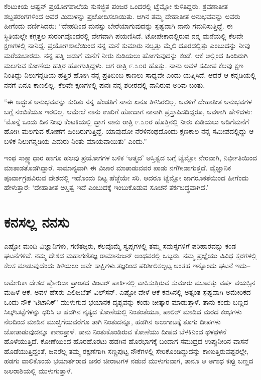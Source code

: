 ಕೆಂಟುಕಿಯ ಆಷ್ಟನ್ ಪ್ರಯೋಗಶಾಲೆಯ ಸುಸಜ್ಜಿತ ಪಂಜರ ಒಂದರಲ್ಲಿ ಟ್ವೆಮ್ಲೋ ಕುಳಿತಿದ್ದರು. ಶ್ರವಣಾತೀತ ಶಬ್ದತರಂಗಗಳಿಂದ ಅವರ ಮಿದುಳನ್ನು ಪ್ರಚೋದಿಸಲಾಯಿತು. ಆಗಿನ ತಮ್ಮ ದೇಹಾತೀತ ಅನುಭವವನ್ನು ಅವರು ಹೀಗೆಂದು ವರ್ಣಿಸಿದರು: “ದೇಹದಿಂದ ಮನಸ್ಸು ಬೇರೆ\-ಯಾಗು\-ವುದನ್ನು ಸ್ಪಷ್ಟವಾಗಿ ನಾನು ಗಮನಿಸುತ್ತಿದ್ದೆ. ಈ ಸ್ಥಿತಿಯಲ್ಲೇ ಕಗ್ಗತ್ತಲ ಸುರಂಗವೊಂದರಲ್ಲಿ ವೇಗವಾಗಿ ಪಯಣಿಸಿದೆ. ಟೋಪೇಕಾದಲ್ಲಿರುವ ನನ್ನ ಮನೆಯಲ್ಲಿ ಕೆಲವೇ ಕ್ಷಣಗಳಲ್ಲಿ ನಾನಿದ್ದೆ. ಪ್ರಯೋಗಶಾಲೆಯಿಂದ ನನ್ನ ಮನೆ ಸುಮಾರು ನಲ್ವತ್ತು ಮೈಲಿ ದೂರದಲ್ಲಿತ್ತು ಎಂಬುದನ್ನು ನೀವು ಮರೆಯಬಾರದು. ನನ್ನ ಪತ್ನಿ ಅಡುಗೆ ಮನೆಗೆ ನೀರು ಕುಡಿಯಲು ಹೋಗುವುದನ್ನು ಕಂಡೆ. ಆಕೆ ಅಲ್ಲಿಂದ ಹಿಂದಿರುಗಿ ಮಲಗುವ ಕೋಣೆಯ ಹತ್ತಿರ ಹೋಗುತ್ತಿದ್ದಳು. ಆಗ ರಾತ್ರಿ ೯.೩೦ರ ಹೊತ್ತು. ನಾನು ಅವಳ ಸಮೀಪ ಕೆಲವು ಕ್ಷಣ ನಿಂತಿದ್ದು ನಿಲುಗನ್ನಡಿಯ ಹತ್ತಿರ ಹೋಗಿ ನನ್ನ ಪ್ರತಿಬಿಂಬ ಕಾಣಲು ಸಾಧ್ಯವೇ ಎಂದು ಯತ್ನಿಸಿದೆ. ಆದರೆ ಆ ಕನ್ನಡಿಯಲ್ಲಿ ನನಗೆ ಏನೂ ಕಾಣಲಿಲ್ಲ. ಕೆಲವೇ ಕ್ಷಣಗಳಲ್ಲಿ ಪುನಃ ನನ್ನ ಶರೀರದಲ್ಲಿ ನಾನಿರುವ ಅರಿವು ಬಂತು.

“ಈ ಅದ್ಭುತ ಅನುಭವವನ್ನು ಕುರಿತು ನನ್ನ ಹೆಂಡತಿಗೆ ನಾನು ಏನೂ ತಿಳಿಸಿರಲಿಲ್ಲ. ಅವಳಿಗೆ ದೇಹಾತೀತ ಅನುಭವಗಳ ಬಗ್ಗೆ ನಂಬಿಕೆಯೂ ಇರಲಿಲ್ಲ. ಆಮೇಲೆ ನಾನು ಊರಿಗೆ ಹೋದಾಗ ನಾನಾಗಿ ಪ್ರಸ್ತಾಪಿಸದಿದ್ದರೂ, ಅವಳಾಗಿ ಹೇಳಿದಳು: ‘ಮೊನ್ನೆ ಒಂದು ದಿನ ನೀವು ಕೆಂಟಕಿಯಲ್ಲಿ ದ್ದಾಗ ನಾನು ರಾತ್ರಿ ೯.೩೦ರ ಹೊತ್ತಿನಲ್ಲಿ ನೀರು ಕುಡಿಯಲು ಅಡಿಗೆಮನೆಗೆ ಹೋಗಿ ಮಲಗುವ ಕೋಣೆಗೆ ಹಿಂದಿರುಗುತ್ತಿದ್ದೆ. ಯಾವುದೋ ನೆರಳಿನಂಥದೊಂದು ಕ್ಷಣಕಾಲ ನನ್ನ ಸಮೀಪದಲ್ಲಿದ್ದು ಆ ಬಳಿಕ ನಿಲುಗನ್ನಡಿಯ ಎದುರು ನಿಂತು ಮಾಯವಾಯಿತು’ ಎಂದು.”

ಇಂಥ ಸಾಕ್ಷ್ಯಾಧಾರ ಹಾಗೂ ಹಲವು ಪ್ರಯೋಗಗಳ ಬಳಿಕ ‘ಆತ್ಮದ’ ಅಸ್ತಿತ್ವದ ಬಗ್ಗೆ ಟ್ವೆಮ್ಲೋ ನೇರವಾಗಿ, ನಿರ್ಭೀತಿಯಿಂದ ಮಾತಾಡತೊಡಗಿದ್ದಾರೆ. ಸಾಮಾನ್ಯವಾಗಿ ಈ ವಿಚಾರ ಮಾತಾಡುವವರ ಪಾಡು ನಗೆಗೀಡಾಗುತ್ತದೆ. ವೈಜ್ಞಾನಿಕ ಪೂರ್ವಾಗ್ರಹವಿರುವ ದೇಶದಲ್ಲಿ ಇದೊಂದು ದಿಟ್ಟ ಹೆಜ್ಜೆಯೇ ಸರಿ. ಆದರೂ ಟ್ವೆಮ್ಲೋ ಜಾಗರೂಕತೆಯಿಂದ ಹೀಗೆಂದು ಹೇಳುತ್ತಾರೆ: ‘ದೇಹಾತೀತ ಅಸ್ತಿತ್ವ ಇದೆ ಎಂಬುದಕ್ಕೆ ಇಂಬುಕೊಡುವ ಸೂಚನೆ ತರ್ಕಬದ್ಧವಾಗಿದೆ.’


\section*{ಕನಸಲ್ಲ ನನಸು}


ಎಷ್ಟೋ ಮಂದಿ ವಿಜ್ಞಾನಿಗಳು, ಗಣಿತಜ್ಞರು, ಕೆಲವೊಮ್ಮೆ ಸ್ವಪ್ನಗಳಲ್ಲಿ ತಮ್ಮ ಸಮಸ್ಯೆಗಳಿಗೆ ಪರಿಹಾರವನ್ನು ಕಂಡ ಘಟನೆಗಳಿವೆ. ನಮ್ಮ ದೇಶದ ಮಹಾಗಣಿತಜ್ಞ ರಾಮಾನುಜನ್ ಅಂಥವರಲ್ಲಿ ಒಬ್ಬರು. ನಮ್ಮ ಪ್ರಜ್ಞೆಯು ವಿವಿಧ ಸ್ತರಗಳಲ್ಲಿ ಕೆಲಸ ಮಾಡುವುದೆಂದು ತಿಳಿಯಲು ಅವೇ ಸಾಕ್ಷಿಗಳು.\break ತಜ್ಞರಿಂದ ಪರಿಶೀಲಿಸಲ್ಪಟ್ಟ ಅಂತಹ ಇನ್ನೊಂದು ಘಟನೆ ಇದು–

ಅಮೇರಿಕಾ ದೇಶದ ಪ್ಲೋರಿಡಾ ಪ್ರಾಂತದ ವಿಂಟರ್ ಪಾರ್ಕಿನಲ್ಲಿ ವಾಸಿಸುತ್ತಿರುವ ಸುಮಾರು ಮೂವತ್ತು ವರ್ಷ ವಯಸ್ಸಿನ ಮಹಿಳೆ ಆಕೆ. ಅವಳ ಹೆಸರು ಎಲಿಜಬೆತ್ ವಿಲ್​ಸನ್. ಎಷ್ಟೋ ವೇಳೆ ಆಕೆ ಕನಸಿನಲ್ಲಿ ಅತ್ಯಂತ ಸ್ಪಷ್ಟವಾಗಿ ಅಮೇರಿಕದ ಒಂದು ನೌಕೆ ‘ಟಿಟಾನಿಕ್​’ ಮುಳುಗುವ ಭಯಾನಕ ದೃಶ್ಯವನ್ನು ಕಂಡು ಚೀತ್ಕಾರ ಮಾಡುತ್ತಾಳೆ. ತಾನು ಕಂದು ಬಣ್ಣದ ಸಿಲ್ಕ್​ಬಟ್ಟೆಗಳನ್ನು ಧರಿಸಿ ಆ ಹಡಗಿನ ನೃತ್ಯದ ಕೋಣೆಯಲ್ಲಿ ನಿಂತಂತೆಯೂ, ಪಾಲಿಶ್ ಮಾಡಿದ ಮರದ ಕಂಭಗಳು ನೆಲದಿಂದ ಮಾಡಿನ ಮುಚ್ಚಿಗೆಯವರೆಗೂ ತಾಗಿ ನಿಂತುದನ್ನೂ, ಹಡಗಿನ ಅಲುಗಾಟಕ್ಕೆ ತೂಗು ದೀಪಗಳು ಜೋತಾಡುವುದನ್ನೂ ಕಾಣುತ್ತಾಳೆ. ತಾನು ನಿಂತುಕೊಂಡಿರುವ ಕೋಣೆಯು ದೀಪದ ಬೆಳಕಿನಿಂದ ಥಳಥಳನೆ ಹೊಳೆಯುತ್ತಿದೆ. ಕೋಣೆಯಿಂದ ಹೊರಹೊರಟು ಹಡಗಿನ ಹೊರಭಾಗಕ್ಕೆ ಬಂದಾಗ ಸಮುದ್ರದ ಉಪ್ಪುನೀರಿನ ವಾಸನೆ ಹೊಡೆಯುತ್ತಿದ್ದಂತೆ, ಜನರೆಲ್ಲ ತಮ್ಮ ರಕ್ಷಣೆಗಾಗಿ ಸಣ್ಣಪುಟ್ಟ ನೌಕೆಗಳಲ್ಲಿ ಸೇರಿಕೊಂಡಿದ್ದುದನ್ನು ಕಾಣುತ್ತಿರುವಷ್ಟರಲ್ಲೇ, ಹಡಗು ವಾಲಿಕೊಂಡು ಭಯಾರ್ತರಾದ ಜನರ ಚೀರಾಟಗಳ ನಡುವೆ ಮುಳುಗುವಾಗ, ತಾನೂ ಆ ಅಗಾಧ ಕಪ್ಪು ಬಣ್ಣದ ಜಲರಾಶಿಯಲ್ಲಿ ಮುಳುಗುತ್ತಾಳೆ.

